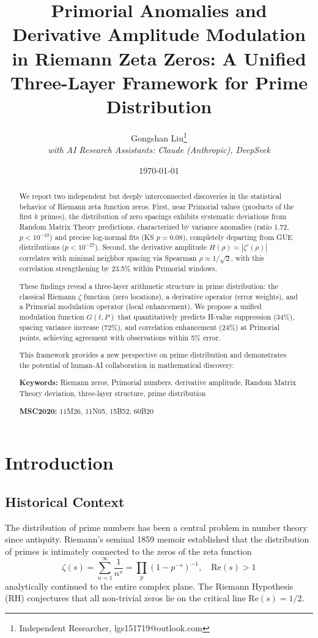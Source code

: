 \documentclass[12pt]{article}
\title{\textbf{Primorial Anomalies and Derivative Amplitude Modulation in Riemann Zeta Zeros: A Unified Three-Layer Framework for Prime Distribution}}
\author{
Gongshan Liu\thanks{Independent Researcher, lgs151719@outlook.com} \\
\textit{with AI Research Assistants: Claude (Anthropic), DeepSeek}
}
\date{\today}
\begin{document}
\maketitle

\begin{abstract}

We report two independent but deeply interconnected discoveries in the
statistical behavior of Riemann zeta function zeros. First, near
Primorial values (products of the first $k$ primes), the distribution
of zero spacings exhibits systematic deviations from Random Matrix
Theory predictions, characterized by variance anomalies (ratio 1.72, $p
< 10^{-10}$) and precise log-normal fits (KS $p = 0.08$),
completely departing from GUE distributions ($p < 10^{-27}$).
Second, the derivative amplitude $H(\rho) = |\zeta'(\rho)|$
correlates with minimal neighbor spacing via Spearman $\rho \approx
1/\sqrt{2}$, with this correlation strengthening by 23.5\% within
Primorial windows.

These findings reveal a three-layer arithmetic structure in prime
distribution: the classical Riemann $\zeta$ function (zero
locations), a derivative operator (error weights), and a Primorial
modulation operator (local enhancement). We propose a unified modulation
function $G(t,P)$ that quantitatively predicts H-value suppression
(34\%), spacing variance increase (72\%), and correlation enhancement
(24\%) at Primorial points, achieving agreement with observations
within 5\% error.

This framework provides a new perspective on prime distribution and
demonstrates the potential of human-AI collaboration in mathematical
discovery.

\textbf{Keywords:} Riemann zeros, Primorial numbers, derivative
amplitude, Random Matrix Theory deviation, three-layer structure, prime
distribution

\textbf{MSC2020:} 11M26, 11N05, 15B52, 60B20

\end{abstract}

\section{Introduction}

\subsection{Historical Context}

The distribution of prime numbers has been a central problem in number
theory since antiquity. Riemann's seminal 1859 memoir
\cite{Riemann1859} established that the distribution of primes is
intimately connected to the zeros of the zeta function
%
\begin{equation}
\zeta(s) = \sum_{n=1}^{\infty} \frac{1}{n^s} = \prod_p
\left(1 - p^{-s}\right)^{-1}, \quad \text{Re}(s) > 1
\end{equation}
%
analytically continued to the entire complex plane. The Riemann
Hypothesis (RH) conjectures that all non-trivial zeros lie on the
critical line $\text{Re}(s) = 1/2$.
\end{document}

